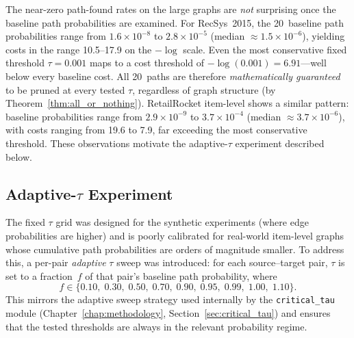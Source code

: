 The near-zero path-found rates on the large graphs are \emph{not} surprising once the baseline path probabilities are examined. For RecSys~2015, the 20~baseline path probabilities range from $1.6 \times 10^{-8}$ to $2.8 \times 10^{-5}$ (median $\approx 1.5 \times 10^{-6}$), yielding costs in the range 10.5--17.9 on the $-\log$ scale. Even the most conservative fixed threshold $\tau = 0.001$ maps to a cost threshold of $-\log(0.001) = 6.91$---well below every baseline cost. All 20~paths are therefore \emph{mathematically guaranteed} to be pruned at every tested $\tau$, regardless of graph structure (by Theorem~\ref{thm:all_or_nothing}). RetailRocket item-level shows a similar pattern: baseline probabilities range from $2.9 \times 10^{-9}$ to $3.7 \times 10^{-4}$ (median $\approx 3.7 \times 10^{-6}$), with costs ranging from 19.6 to 7.9, far exceeding the most conservative threshold. These observations motivate the adaptive-$\tau$ experiment described below.

\subsection{Adaptive-\texorpdfstring{$\tau$}{tau} Experiment}\label{sec:adaptive_tau}

The fixed $\tau$ grid was designed for the synthetic experiments (where edge probabilities are higher) and is poorly calibrated for real-world item-level graphs whose cumulative path probabilities are orders of magnitude smaller. To address this, a per-pair \emph{adaptive} $\tau$ sweep was introduced: for each source--target pair, $\tau$ is set to a fraction~$f$ of that pair's baseline path probability, where
\[
  f \in \{0.10,\; 0.30,\; 0.50,\; 0.70,\; 0.90,\; 0.95,\; 0.99,\; 1.00,\; 1.10\}.
\]
This mirrors the adaptive sweep strategy used internally by the \texttt{critical\_tau} module (Chapter~\ref{chap:methodology}, Section~\ref{sec:critical_tau}) and ensures that the tested thresholds are always in the relevant probability regime.

\begin{table}[htbp]
\centering
\renewcommand{\arraystretch}{1.3}
\caption[Adaptive-$\tau$ real-data speedup]{Adaptive-$\tau$ speedup results.}
\label{table:real_data_adaptive}
\end{table}

